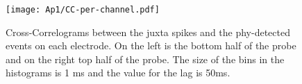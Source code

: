 \label{ap:a}

\begin{landscape}
\begin{figure}[!h]
	\centering
	\texttt{[image: Ap1/CC-per-channel.pdf]}
	\caption{Cross-Correlograms between the juxta spikes and the phy-detected events on each electrode. On the left is the bottom half of the probe and on the right top half of the probe. The size of the bins in the histograms is 1 ms and the value for the lag is 50ms.
}
\label{fig:CC-per-channel}
\end{figure}

\end{landscape}